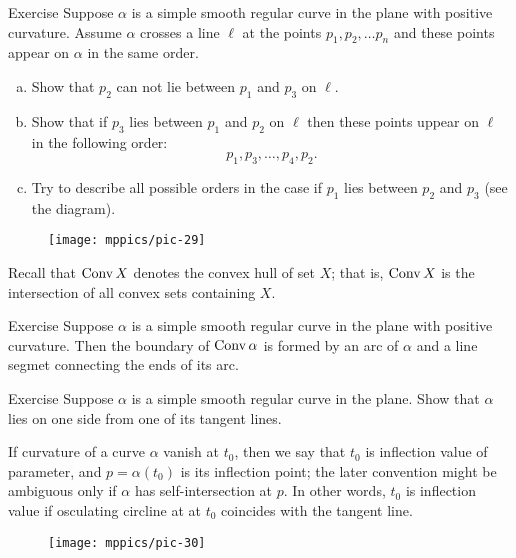 \begin{thm}{Exercise}
Suppose $\alpha$ is a simple smooth regular curve in the plane with positive curvature.
Assume $\alpha$ crosses a line $\ell$ at the points $p_1,p_2,\dots p_n$ and these points appear on $\alpha$ in the same order.
\begin{enumerate}[(a)]

\item Show that $p_2$ can not lie between $p_1$ and $p_3$ on $\ell$.

\item Show that if $p_3$ lies between $p_1$ and $p_2$ on $\ell$ then these points uppear on $\ell$ in the following order:  
\[p_1,p_3,\dots,p_4 ,p_2.\]

\item Try to describe all possible orders in the case if $p_1$ lies between $p_2$ and $p_3$ (see the diagram).

\end{enumerate}
\end{thm}

\begin{figure}[h!]
\vskip-0mm
\centering
\texttt{[image: mppics/pic-29]}
\vskip0mm
\end{figure}

Recall that $\mathop{\rm Conv}\nolimits X$ denotes the convex hull of set $X$;
that is, $\mathop{\rm Conv}\nolimits X$ is the intersection of all convex sets containing $X$.

\begin{thm}{Exercise}\label{ex:convex-hull}
Suppose $\alpha$ is a simple smooth regular curve in the plane with positive curvature.
Then the boundary of $\mathop{\rm Conv}\nolimits \alpha$ is formed by an arc of $\alpha$ and a line segmet connecting the ends of its arc.
\end{thm}

\begin{thm}{Exercise}
Suppose $\alpha$ is a simple smooth regular curve in the plane.
Show that $\alpha$ lies on one side from one of its tangent lines. 
\end{thm}

If curvature of a curve $\alpha$ vanish at $t_0$, then we say that $t_0$ is inflection value of parameter, and $p=\alpha(t_0)$ is its inflection point;
the later convention might be ambiguous only if $\alpha$ has self-intersection at $p$. 
In other words, $t_0$ is inflection value if osculating circline at at $t_0$ coincides with the tangent line. 

\begin{wrapfigure}{r}{30 mm}
\vskip-4mm
\centering
\texttt{[image: mppics/pic-30]}
\vskip0mm
\end{wrapfigure}

